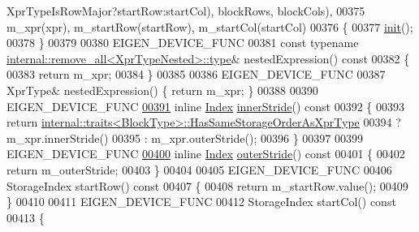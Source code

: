 \begin{DoxyCode}
      XprTypeIsRowMajor?startRow:startCol), blockRows, blockCols),
00375         m\_xpr(xpr), m\_startRow(startRow), m\_startCol(startCol)
00376     \{
00377       \hyperlink{structinit}{init}();
00378     \}
00379 
00380     EIGEN\_DEVICE\_FUNC
00381     \textcolor{keyword}{const} \textcolor{keyword}{typename} \hyperlink{group___sparse_core___module}{internal::remove\_all<XprTypeNested>::type}& 
      nestedExpression()\textcolor{keyword}{ const}
00382 \textcolor{keyword}{    }\{ 
00383       \textcolor{keywordflow}{return} m\_xpr; 
00384     \}
00385 
00386     EIGEN\_DEVICE\_FUNC
00387     XprType& nestedExpression() \{ \textcolor{keywordflow}{return} m\_xpr; \}
00388       
00390     EIGEN\_DEVICE\_FUNC
\hyperlink{class_eigen_1_1internal_1_1_block_impl__dense_3_01_xpr_type_00_01_block_rows_00_01_block_cols_00_01_inner_panel_00_01true_01_4_a91fea2e027a3b057b5f70ab52a1a24b7}{00391}     \textcolor{keyword}{inline} \hyperlink{namespace_eigen_a62e77e0933482dafde8fe197d9a2cfde}{Index} \hyperlink{class_eigen_1_1internal_1_1_block_impl__dense_3_01_xpr_type_00_01_block_rows_00_01_block_cols_00_01_inner_panel_00_01true_01_4_a91fea2e027a3b057b5f70ab52a1a24b7}{innerStride}()\textcolor{keyword}{ const}
00392 \textcolor{keyword}{    }\{
00393       \textcolor{keywordflow}{return} \hyperlink{struct_eigen_1_1internal_1_1traits}{internal::traits<BlockType>::HasSameStorageOrderAsXprType}
00394              ? m\_xpr.innerStride()
00395              : m\_xpr.outerStride();
00396     \}
00397 
00399     EIGEN\_DEVICE\_FUNC
\hyperlink{class_eigen_1_1internal_1_1_block_impl__dense_3_01_xpr_type_00_01_block_rows_00_01_block_cols_00_01_inner_panel_00_01true_01_4_ac6f37b9a06897f0891fcd7b65ce2800e}{00400}     \textcolor{keyword}{inline} \hyperlink{namespace_eigen_a62e77e0933482dafde8fe197d9a2cfde}{Index} \hyperlink{class_eigen_1_1internal_1_1_block_impl__dense_3_01_xpr_type_00_01_block_rows_00_01_block_cols_00_01_inner_panel_00_01true_01_4_ac6f37b9a06897f0891fcd7b65ce2800e}{outerStride}()\textcolor{keyword}{ const}
00401 \textcolor{keyword}{    }\{
00402       \textcolor{keywordflow}{return} m\_outerStride;
00403     \}
00404 
00405     EIGEN\_DEVICE\_FUNC
00406     StorageIndex startRow()\textcolor{keyword}{ const}
00407 \textcolor{keyword}{    }\{
00408       \textcolor{keywordflow}{return} m\_startRow.value();
00409     \}
00410 
00411     EIGEN\_DEVICE\_FUNC
00412     StorageIndex startCol()\textcolor{keyword}{ const}
00413 \textcolor{keyword}{    }\{

\end{DoxyCode}
